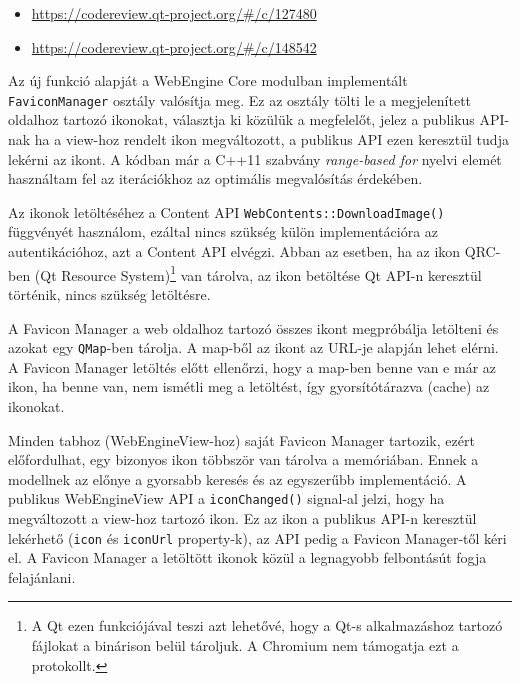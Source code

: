 \documentclass[12pt]{report}
\let\origurl\url
\renewcommand{\url}[1]{%
    \textcolor{blue}{\origurl{#1}}
}
\newcommand{\gerrit}[1]{%
    \textcolor{qtgreen}{\origurl{https://codereview.qt-project.org/\#/c/#1}}
}
\begin{document}
\begin{center}
    \begin{reviewbox}
        \begin{itemize}
            \renewcommand{\labelitemi}{\textcolor{qtgreen}{$\blacktriangleright$}}
            \item \gerrit{127480}
            \item \gerrit{148542}
        \end{itemize}
    \end{reviewbox}
\end{center}

Az új funkció alapját a WebEngine Core modulban implementált \texttt{FaviconManager} osztály
valósítja meg. Ez az osztály tölti le a megjelenített oldalhoz tartozó ikonokat,
választja ki közülük a megfelelőt, jelez a publikus API-nak ha a view-hoz rendelt ikon
megváltozott, a publikus API ezen keresztül tudja lekérni az ikont.
A kódban már a C++11 szabvány \textit{range-based for} nyelvi elemét használtam fel az
iterációkhoz az optimális megvalósítás érdekében.

Az ikonok letöltéséhez a Content API \texttt{WebContents::DownloadImage()} függvényét
használom, ezáltal nincs szükség külön implementációra az autentikációhoz, azt a Content API
elvégzi. Abban az esetben, ha az ikon QRC-ben (Qt Resource System)\footnote{A Qt ezen
    funkciójával teszi azt lehetővé, hogy a Qt-s alkalmazáshoz tartozó fájlokat a
    binárison belül tároljuk. A Chromium nem támogatja ezt a protokollt.}
van tárolva, az ikon betöltése Qt API-n keresztül történik, nincs szükség letöltésre.

A Favicon Manager a web oldalhoz tartozó összes ikont megpróbálja letölteni és azokat egy
\texttt{QMap}-ben tárolja. A map-ből az ikont az URL-je alapján lehet elérni. A Favicon
Manager letöltés előtt ellenőrzi, hogy a map-ben benne van e már az ikon, ha benne van,
nem ismétli meg a letöltést, így gyorsítótárazva (cache) az ikonokat.

Minden tabhoz (WebEngineView-hoz) saját Favicon Manager tartozik, ezért előfordulhat, egy
bizonyos ikon többször van tárolva a memóriában. Ennek a modellnek az előnye a gyorsabb
keresés és az egyszerűbb implementáció. A publikus WebEngineView API a
\texttt{iconChanged()} signal-al jelzi, hogy ha megváltozott a view-hoz tartozó ikon.
Ez az ikon a publikus API-n keresztül lekérhető (\texttt{icon} és \texttt{iconUrl}
property-k), az API pedig a Favicon Manager-től kéri el.
A Favicon Manager a letöltött ikonok közül a legnagyobb felbontásút fogja felajánlani.
\end{document}
